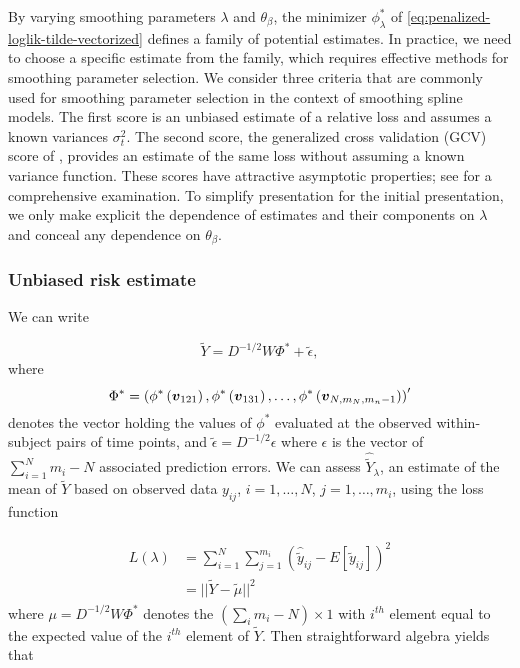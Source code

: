 \documentclass[12pt]{article}
\newcommand{\tildeY}{\tilde{Y}}
\newcommand{\tildey}{\tilde{y}}
\newcommand{\tildeepsilon}{\tilde{\epsilon}}
\newcommand{\bfv}{\mbox{\boldmath $v$}}
\theoremstyle{definition}
\begin{document}
By varying smoothing parameters $\lambda$ and $\theta_\beta$, the minimizer $\phi^*_\lambda$ of \ref{eq:penalized-loglik-tilde-vectorized} defines a family of potential estimates. In practice, we need to choose a specific estimate from the family, which requires effective methods for smoothing parameter selection. We consider three criteria that are commonly used for smoothing parameter selection in the context of smoothing spline models. The first score is an unbiased estimate of a relative loss and assumes a known variances $\sigma_t^2$. The second score, the generalized cross validation (GCV) score of \citet{craven1978smoothing}, provides an estimate of the same loss without assuming a known variance function. These scores have attractive asymptotic properties; see \citet{gu2013smoothing} for a comprehensive examination.   To simplify presentation for the initial presentation, we only make explicit the dependence of estimates and their components on $\lambda$ and conceal any dependence on $\theta_\beta$. 

\subsubsection{Unbiased risk estimate}

We can write

\begin{equation} 
\tildeY = D^{-1/2}W \Phi^* + \tildeepsilon,
\end{equation}
\noindent
where 
\[
\Phi^* = \left( \phi^*\left( \bfv_{121} \right), \phi^*\left( \bfv_{131} \right), \dots, \phi^*\left( \bfv_{N,m_N, m_n -1} \right) \right)'
\]
\noindent
denotes the vector holding the values of $\phi^*$ evaluated at the observed within-subject pairs of time points, and $\tildeepsilon = D^{-1/2} \epsilon$ where $\epsilon$ is the vector of $\sum_{i = 1}^Nm_i - N$ associated prediction errors.  We can assess $\hat{\tildeY}_\lambda$, an estimate of the mean of $\tildeY$ based on observed data $y_{ij}$, $i = 1,\dots, N$, $j = 1,\dots, m_i$, using the loss function

\begin{align}
\begin{split}
L\left(\lambda\right) &= \sum_{i = 1}^N \sum_{j = 1}^{m_i} \left(\hat{\tildey}_{ij} - E\left[\tildey_{ij}\right] \right)^2\\
&= \vert \vert \tildeY - \tilde{\mu} \vert \vert^2
\end{split}
\end{align}
\noindent
where $\mu = D^{-1/2}W \Phi^*$ denotes the $\left( \sum \limits_{i} m_i - N\right) \times 1$ with $i^{th}$ element equal to the expected value of the  $i^{th}$ element of $\tildeY$.  Then straightforward algebra yields that 
\end{document}
